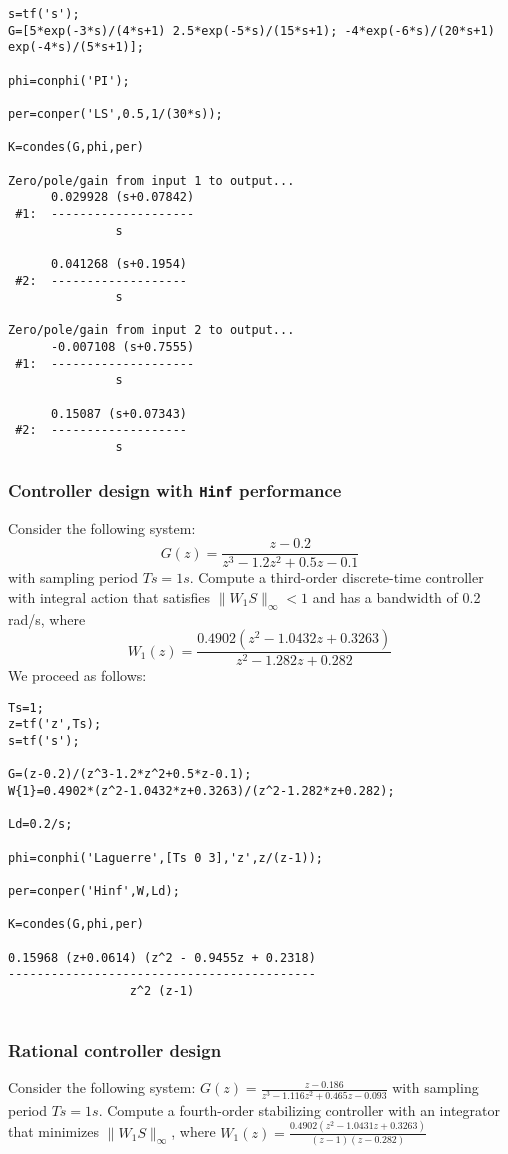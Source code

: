 \documentclass [12pt , a4paper] {report}
\begin{document}
\begin{lstlisting}
s=tf('s');
G=[5*exp(-3*s)/(4*s+1) 2.5*exp(-5*s)/(15*s+1); -4*exp(-6*s)/(20*s+1) exp(-4*s)/(5*s+1)];

phi=conphi('PI'); 

per=conper('LS',0.5,1/(30*s)); 

K=condes(G,phi,per)

Zero/pole/gain from input 1 to output...
      0.029928 (s+0.07842)
 #1:  --------------------
               s
 
      0.041268 (s+0.1954)
 #2:  -------------------
               s
 
Zero/pole/gain from input 2 to output...
      -0.007108 (s+0.7555)
 #1:  --------------------
               s
 
      0.15087 (s+0.07343)
 #2:  -------------------
               s
\end{lstlisting}

\subsubsection{Controller design with {\tt Hinf} performance}
Consider the following system:
$$G(z)=\frac{z-0.2}{z^3-1.2z^2+0.5z-0.1}$$
with sampling period $Ts=1 s$. Compute a third-order discrete-time controller with integral action that satisfies $\| W_1 S\|_\infty < 1$ and has a bandwidth of 0.2 rad/s, where
$$W_1(z)=\frac{0.4902(z^2-1.0432z+0.3263)}{z^2-1.282z+0.282}$$
We proceed as follows:
\begin{lstlisting}
Ts=1;
z=tf('z',Ts);
s=tf('s');

G=(z-0.2)/(z^3-1.2*z^2+0.5*z-0.1);
W{1}=0.4902*(z^2-1.0432*z+0.3263)/(z^2-1.282*z+0.282);

Ld=0.2/s;

phi=conphi('Laguerre',[Ts 0 3],'z',z/(z-1));

per=conper('Hinf',W,Ld);

K=condes(G,phi,per)

0.15968 (z+0.0614) (z^2 - 0.9455z + 0.2318)
-------------------------------------------
                 z^2 (z-1)


\end{lstlisting}


\subsubsection{Rational controller design}
Consider the following system:
$G(z) = \frac{z-0.186}{z^3 - 1.116z^2 + 0.465 z - 0.093}$
with sampling period $Ts = 1 s$. Compute a fourth-order stabilizing controller with an integrator that minimizes $\| W_1 S\|_\infty$, where
$W_1(z) = \frac{0.4902 \left( z^2 - 1.0431 z + 0.3263\right)}{(z-1)(z-0.282)}$
\end{document}
